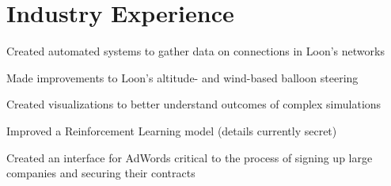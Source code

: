 \documentclass[letterpaper]{deedy-resume} %
\begin{document}
\hfill
%
%
\begin{minipage}[t]{0.66\textwidth} %


\section{Industry Experience}


\vspace{\topsep} %
\begin{tightitemize}
    \item Created automated systems to gather data on connections in Loon’s networks
    \item Made improvements to Loon's altitude- and wind-based balloon steering
    \item Created visualizations to better understand outcomes of complex simulations
    \item Improved a Reinforcement Learning model (details currently secret)
\end{tightitemize}

\sectionspace %



\begin{tightitemize}
    \item Created an interface for AdWords critical to the process of signing up large companies and securing their contracts
\end{tightitemize}

\sectionspace %


\end{minipage}
\end{document}
